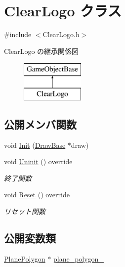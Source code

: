 \hypertarget{class_clear_logo}{}\section{Clear\+Logo クラス}
\label{class_clear_logo}


{\ttfamily \#include $<$Clear\+Logo.\+h$>$}

Clear\+Logo の継承関係図\begin{figure}[H]
\begin{center}
\leavevmode
\includegraphics[height=2.000000cm]{class_clear_logo}
\end{center}
\end{figure}
\subsection*{公開メンバ関数}
\begin{DoxyCompactItemize}
\item 
void \mbox{\hyperlink{class_clear_logo_a46c1a948342d75bb418047a31e70999d}{Init}} (\mbox{\hyperlink{class_draw_base}{Draw\+Base}} $\ast$draw)
\item 
void \mbox{\hyperlink{class_clear_logo_ab55def116615b92a8e8cc40b364b7a4c}{Uninit}} () override
\begin{DoxyCompactList}\small\item\em 終了関数 \end{DoxyCompactList}\item 
void \mbox{\hyperlink{class_clear_logo_aa19369cbace0cc79957ef7b4d4dbd0f5}{Reset}} () override
\begin{DoxyCompactList}\small\item\em リセット関数 \end{DoxyCompactList}\end{DoxyCompactItemize}
\subsection*{公開変数類}
\begin{DoxyCompactItemize}
\item 
\mbox{\hyperlink{class_plane_polygon}{Plane\+Polygon}} $\ast$ \mbox{\hyperlink{class_clear_logo_ad4c1abbd7e501cc44357c9f65e12482f}{plane\+\_\+polygon\+\_\+}}
\end{DoxyCompactItemize}
